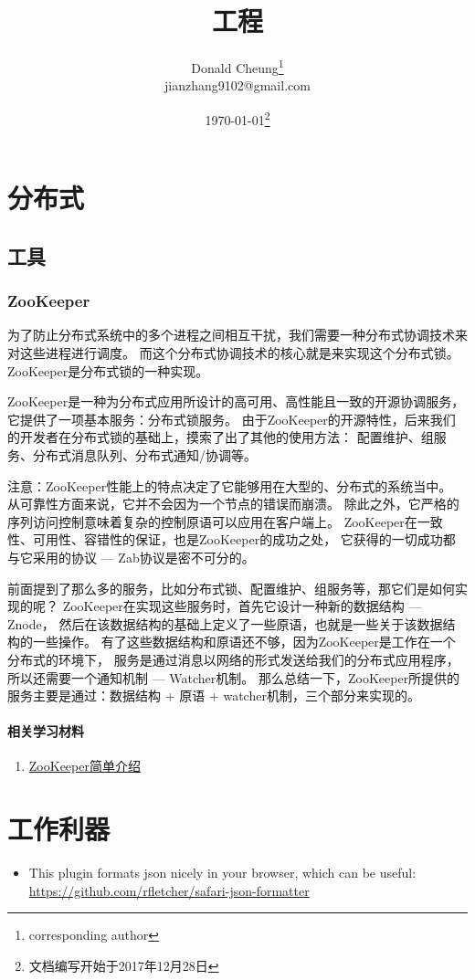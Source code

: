 \documentclass[utf8,a4paper,10pt]{ctexbook}
\title{工程}
\author{Donald Cheung\thanks{corresponding author}\\jianzhang9102@gmail.com}
\date{\today\footnote{文档编写开始于2017年12月28日}}
\begin{document}
\maketitle
\tableofcontents

\chapter{分布式}

\section{工具}

\subsection{ZooKeeper}
为了防止分布式系统中的多个进程之间相互干扰，我们需要一种分布式协调技术来对这些进程进行调度。
而这个分布式协调技术的核心就是来实现这个分布式锁。ZooKeeper是分布式锁的一种实现。

ZooKeeper是一种为分布式应用所设计的高可用、高性能且一致的开源协调服务，
它提供了一项基本服务：分布式锁服务。
由于ZooKeeper的开源特性，后来我们的开发者在分布式锁的基础上，摸索了出了其他的使用方法：
配置维护、组服务、分布式消息队列、分布式通知/协调等。

注意：ZooKeeper性能上的特点决定了它能够用在大型的、分布式的系统当中。
从可靠性方面来说，它并不会因为一个节点的错误而崩溃。
除此之外，它严格的序列访问控制意味着复杂的控制原语可以应用在客户端上。
ZooKeeper在一致性、可用性、容错性的保证，也是ZooKeeper的成功之处，
它获得的一切成功都与它采用的协议 --- Zab协议是密不可分的。

前面提到了那么多的服务，比如分布式锁、配置维护、组服务等，那它们是如何实现的呢？
ZooKeeper在实现这些服务时，首先它设计一种新的数据结构 --- Znode，
然后在该数据结构的基础上定义了一些原语，也就是一些关于该数据结构的一些操作。
有了这些数据结构和原语还不够，因为ZooKeeper是工作在一个分布式的环境下，
服务是通过消息以网络的形式发送给我们的分布式应用程序，所以还需要一个通知机制 --- Watcher机制。
那么总结一下，ZooKeeper所提供的服务主要是通过：数据结构 + 原语 + watcher机制，三个部分来实现的。

\subsubsection{相关学习材料}
\begin{enumerate}
    \item \href{http://www.cnblogs.com/sunddenly/p/4033574.html}{ZooKeeper简单介绍}
\end{enumerate}


\chapter{工作利器}

\begin{itemize}
    \item This plugin formats json nicely in your browser, which can be useful:
          \url{https://github.com/rfletcher/safari-json-formatter}

\end{itemize}
\end{document}
